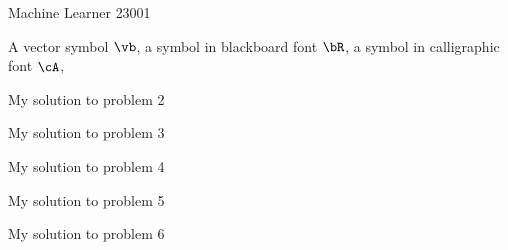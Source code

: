 \documentclass[a4paper,11pt]{article}
\begin{document}
{Machine Learner}   %
{23001}	%

\begin{mlsolution}

A vector symbol $\vb$, a symbol in blackboard font $\bR$, a symbol in calligraphic font $\cA$,   


\end{mlsolution}

\begin{mlsolution} 

My solution to problem 2


\end{mlsolution}

\begin{mlsolution}

My solution to problem 3

\end{mlsolution}

\begin{mlsolution}

My solution to problem 4

\end{mlsolution}
	
\begin{mlsolution}

My solution to problem 5

\end{mlsolution}

\begin{mlsolution}

My solution to problem 6

\end{mlsolution}
\end{document}
